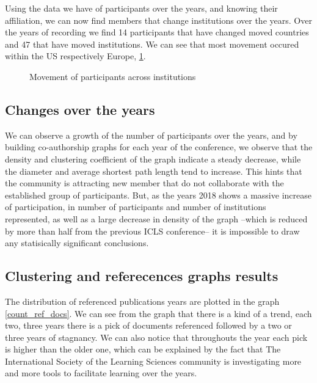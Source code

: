 \documentclass[article,twocolumn]{IEEEtran}
\begin{document}
Using the data we have of participants over the years, and knowing their
affiliation, we can now find members that change institutions over the
years. Over the years of recording we find 14 participants that have
changed moved countries and 47 that have moved institutions. We can see
that most movement occured within the US respectively Europe,
\ref{fig_move}.


    \begin{figure}
        \begin{center}\end{center}
        \caption{Movement of participants across institutions}
        \label{fig_move}
    \end{figure}
    
    \hypertarget{changes-over-the-years}{%
\subsection{Changes over the years}\label{changes-over-the-years}}

We can observe a growth of the number of participants over the years,
and by building co-authorship graphs for each year of the conference, we
observe that the density and clustering coefficient of the graph
indicate a steady decrease, while the diameter and average shortest path
length tend to increase. This hints that the community is attracting new
member that do not collaborate with the established group of
participants. But, as the years 2018 shows a massive increase of
participation, in number of participants and number of institutions
represented, as well as a large decrease in density of the graph --which
is reduced by more than half from the previous ICLS conference-- it is
impossible to draw any statisically significant conclusions.

    \hypertarget{clustering-and-referecences-graphs-results}{%
\subsection{Clustering and referecences graphs
results}\label{clustering-and-referecences-graphs-results}}

The distribution of referenced publications years are plotted in the
graph \ref{count_ref_docs}. We can see from the graph that there is a
kind of a trend, each two, three years there is a pick of documents
referenced followed by a two or three years of stagnancy. We can also
notice that throughouts the year each pick is higher than the older one,
which can be explained by the fact that The International Society of the
Learning Sciences community is investigating more and more tools to
facilitate learning over the years.
\end{document}
